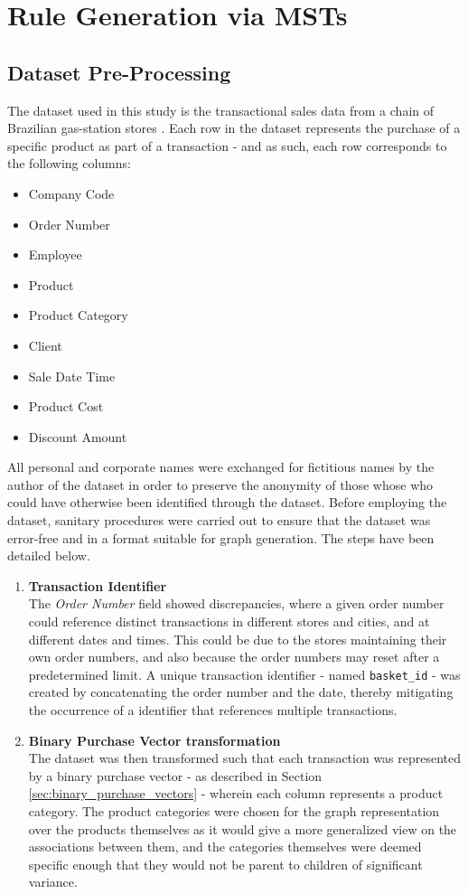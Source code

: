 
\chapter{Rule Generation via MSTs}

\section{Dataset Pre-Processing}
The dataset used in this study is the transactional sales data from a chain of Brazilian gas-station stores .
Each row in the dataset represents the purchase of a specific product as part of a transaction - and as such, each row corresponds to the following columns:
\begin{itemize}
\item Company Code
\item Order Number
\item Employee
\item Product
\item Product Category
\item Client
\item Sale Date Time
\item Product Cost
\item Discount Amount
\end{itemize}
All personal and corporate names were exchanged for fictitious names by the author of the dataset in order to preserve the anonymity of those whose who could have otherwise been identified through the dataset. Before employing the dataset, sanitary procedures were carried out to ensure that the dataset was error-free and in a format suitable for graph generation. The steps have been detailed below.

\begin{enumerate}
\item \textbf{Transaction Identifier}\\
The \textit{Order Number} field showed discrepancies, where a given order number could reference distinct transactions in different stores and cities, and at different dates and times. 
This could be due to the stores maintaining their own order numbers, and also because the order numbers may reset after a predetermined limit.
A unique transaction identifier - named \texttt{basket\_id} - was created by concatenating the order number and the date, thereby mitigating the occurrence of a identifier that references multiple transactions.

\item \textbf{Binary Purchase Vector transformation}\\
The dataset was then transformed such that each transaction was represented by a binary purchase vector - as described in Section \ref{sec:binary_purchase_vectors} - wherein each column represents a product category. The product categories were chosen for the graph representation over the products themselves as it would give a more generalized view on the associations between them, and the categories themselves were deemed specific enough that they would not be parent to children of significant variance.

\end{enumerate} 
